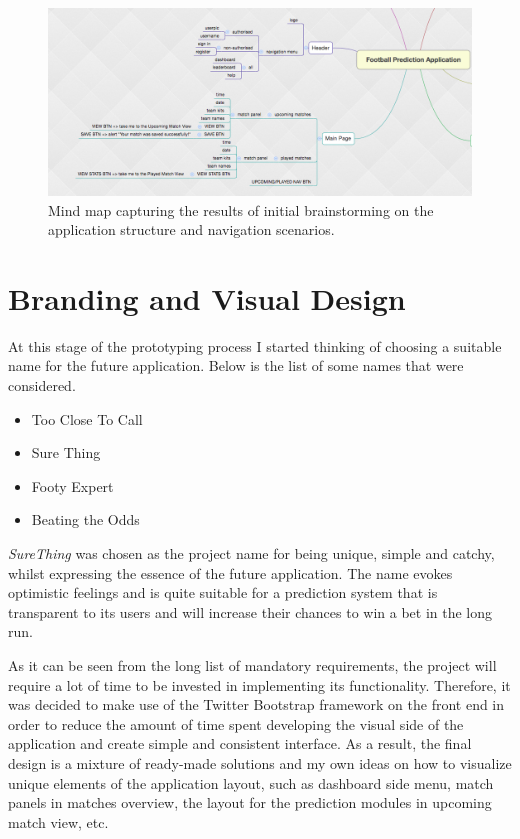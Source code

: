 \begin{figure}[H]
	\begin{center}
		\includegraphics[width=.90\textwidth]{design/images/mindmap}
		\caption{Mind map capturing the results of initial brainstorming on the application structure and navigation scenarios.}
		\label{fig:using:mindmap}
	\end{center}
\end{figure}

\section{Branding and Visual Design}
\label{sec:visdesign_prototype}
At this stage of the prototyping process I started thinking of choosing a suitable name for the future application. Below is the list of some names that were considered.

\begin{itemize}
	\item Too Close To Call
	\item Sure Thing
	\item Footy Expert
	\item Beating the Odds
\end{itemize}

\emph{SureThing} was chosen as the project name for being unique, simple and catchy, whilst expressing the essence of the future application. The name evokes optimistic feelings and is quite suitable for a prediction system that is transparent to its users and will increase their chances to win a bet in the long run. 

As it can be seen from the long list of mandatory requirements, the project will require a lot of time to be invested in implementing its functionality. Therefore, it was decided to make use of the Twitter Bootstrap framework on the front end \citep{documentation:Bootstrap3} \citep{web:templateProgressus} in order to reduce the amount of time spent developing the visual side of the application and create simple and consistent interface. As a result, the final design is a mixture of ready-made solutions and my own ideas on how to visualize unique elements of the application layout, such as dashboard side menu, match panels in matches overview, the layout for the prediction modules in upcoming match view, etc. 

